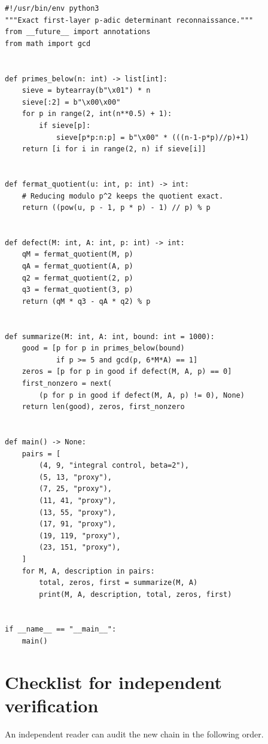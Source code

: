 \documentclass[11pt,oneside]{article}
\theoremstyle{definition}
\begin{document}
\begin{lstlisting}[style=pythonstyle,caption={Exact script used for
\cref{tab:fermat-scan}.}]
#!/usr/bin/env python3
"""Exact first-layer p-adic determinant reconnaissance."""
from __future__ import annotations
from math import gcd


def primes_below(n: int) -> list[int]:
    sieve = bytearray(b"\x01") * n
    sieve[:2] = b"\x00\x00"
    for p in range(2, int(n**0.5) + 1):
        if sieve[p]:
            sieve[p*p:n:p] = b"\x00" * (((n-1-p*p)//p)+1)
    return [i for i in range(2, n) if sieve[i]]


def fermat_quotient(u: int, p: int) -> int:
    # Reducing modulo p^2 keeps the quotient exact.
    return ((pow(u, p - 1, p * p) - 1) // p) % p


def defect(M: int, A: int, p: int) -> int:
    qM = fermat_quotient(M, p)
    qA = fermat_quotient(A, p)
    q2 = fermat_quotient(2, p)
    q3 = fermat_quotient(3, p)
    return (qM * q3 - qA * q2) % p


def summarize(M: int, A: int, bound: int = 1000):
    good = [p for p in primes_below(bound)
            if p >= 5 and gcd(p, 6*M*A) == 1]
    zeros = [p for p in good if defect(M, A, p) == 0]
    first_nonzero = next(
        (p for p in good if defect(M, A, p) != 0), None)
    return len(good), zeros, first_nonzero


def main() -> None:
    pairs = [
        (4, 9, "integral control, beta=2"),
        (5, 13, "proxy"),
        (7, 25, "proxy"),
        (11, 41, "proxy"),
        (13, 55, "proxy"),
        (17, 91, "proxy"),
        (19, 119, "proxy"),
        (23, 151, "proxy"),
    ]
    for M, A, description in pairs:
        total, zeros, first = summarize(M, A)
        print(M, A, description, total, zeros, first)


if __name__ == "__main__":
    main()
\end{lstlisting}

\section{Checklist for independent verification}\label{app:checklist}

An independent reader can audit the new chain in the following order.
\end{document}
